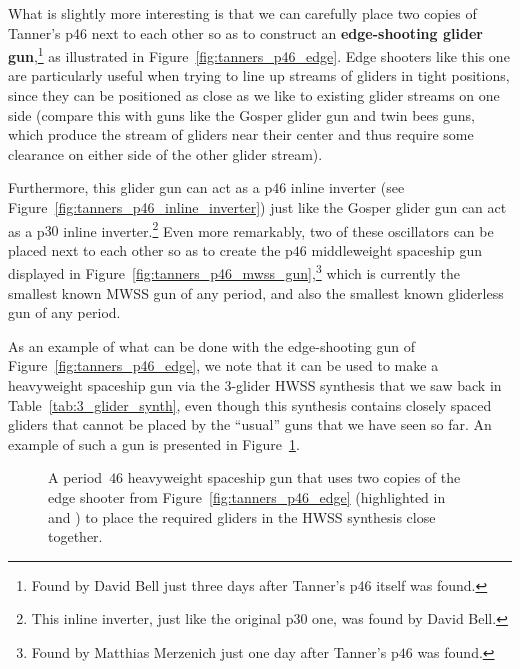 What is slightly more interesting is that we can carefully place two copies of Tanner's p46 next to each other so as to construct an \textbf{edge-shooting glider gun},\footnote{Found by David Bell just three days after Tanner's p$46$ itself was found.} as illustrated in Figure~\ref{fig:tanners_p46_edge}. Edge shooters like this one are particularly useful when trying to line up streams of gliders in tight positions, since they can be positioned as close as we like to existing glider streams on one side (compare this with guns like the Gosper glider gun and twin bees guns, which produce the stream of gliders near their center and thus require some clearance on either side of the other glider stream).

Furthermore, this glider gun can act as a p$46$ inline inverter (see Figure~\ref{fig:tanners_p46_inline_inverter}) just like the Gosper glider gun can act as a p$30$ inline inverter.\footnote{This inline inverter, just like the original p$30$ one, was found by David Bell.} Even more remarkably, two of these oscillators can be placed next to each other so as to create the p$46$ middleweight spaceship gun displayed in Figure~\ref{fig:tanners_p46_mwss_gun},\footnote{Found by Matthias Merzenich just one day after Tanner's p$46$ was found.} which is currently the smallest known MWSS gun of any period, and also the smallest known gliderless gun of any period.

As an example of what can be done with the edge-shooting gun of Figure~\ref{fig:tanners_p46_edge}, we note that it can be used to make a heavyweight spaceship gun via the $3$-glider HWSS synthesis that we saw back in Table~\ref{tab:3_glider_synth}, even though this synthesis contains closely spaced gliders that cannot be placed by the ``usual'' guns that we have seen so far. An example of such a gun is presented in Figure~\ref{fig:p46_hwss_gun}.

\begin{figure}[!htb]
	\centering
	\caption{A period~$46$ heavyweight spaceship gun that uses two copies of the edge shooter from Figure~\ref{fig:tanners_p46_edge} (highlighted in  and ) to place the required gliders in the HWSS synthesis close together.}
	\label{fig:p46_hwss_gun}
\end{figure}


